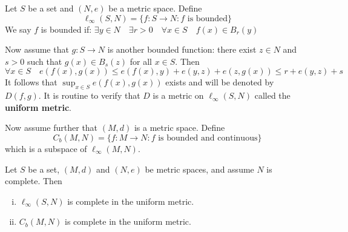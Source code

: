 \documentclass[a4paper,11pt]{article}
\begin{document}
\begin{definition}
    Let $S$ be a set and $(N, e)$ be a metric space. Define
    \[
    \ell_{\infty}(S, N)=\{f: S \rightarrow N: f \text { is bounded}\}
    \]
    We say $f$ is bounded if: $\exists y \in N \quad \exists r>0 \quad \forall x \in S \quad f(x) \in B_r(y)$

    Now assume that $g: S \rightarrow N$ is another bounded function: there exist $z \in N$ and $s>0$ such that $g(x) \in B_s(z)$ for all $x \in S$. Then
    \[
    \forall x \in S \quad e(f(x), g(x)) \leqslant e(f(x), y)+e(y, z)+e(z, g(x)) \leqslant r+e(y, z)+s
    \]
    It follows that $\sup _{x \in S} e(f(x), g(x))$ exists and will be denoted by $D(f, g)$. It is routine to verify that $D$ is a metric on $\ell_{\infty}(S, N)$ called the \textbf{uniform metric}.

    Now assume further that $(M, d)$ is a metric space. Define
    \[
    C_b(M, N)=\{f: M \rightarrow N: f \text { is bounded and continuous}\}
    \]
    which is a subspace of $\ell_{\infty}(M, N)$.
\end{definition}

\begin{theorem}\label{thm:19}
    Let $S$ be a set, $(M, d)$ and $(N, e)$ be metric spaces, and assume $N$ is complete. Then
\begin{enumerate}[(i)]
    \item $\ell_{\infty}(S, N)$ is complete in the uniform metric.
    \item $C_b(M, N)$ is complete in the uniform metric.
\end{enumerate}
\end{theorem}
\end{document}
